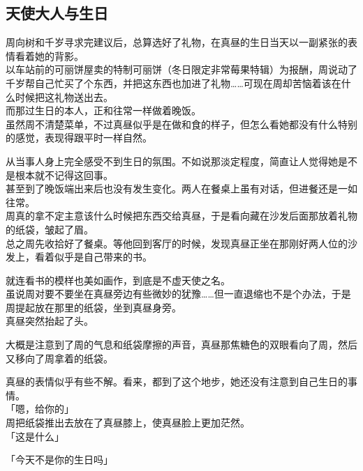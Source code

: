 \subsection{天使大人与生日}

周向树和千岁寻求完建议后，总算选好了礼物，在真昼的生日当天以一副紧张的表情看着她的背影。\\

以车站前的可丽饼屋卖的特制可丽饼（冬日限定非常莓果特辑）为报酬，周说动了千岁帮自己忙买了个东西，并把这东西也加进了礼物……可现在周却苦恼着该在什么时候把这礼物送出去。\\

而那过生日的本人，正和往常一样做着晚饭。\\

虽然周不清楚菜单，不过真昼似乎是在做和食的样子，但怎么看她都没有什么特别的感觉，表现得跟平时一样自然。

从当事人身上完全感受不到生日的氛围。不如说那淡定程度，简直让人觉得她是不是根本就不记得这回事。\\

甚至到了晚饭端出来后也没有发生变化。两人在餐桌上虽有对话，但进餐还是一如往常。\\

周真的拿不定主意该什么时候把东西交给真昼，于是看向藏在沙发后面那放着礼物的纸袋，皱起了眉。\\

总之周先收拾好了餐桌。等他回到客厅的时候，发现真昼正坐在那刚好两人位的沙发上，看着似乎是自己带来的书。

就连看书的模样也美如画作，到底是不虚天使之名。\\

虽说周对要不要坐在真昼旁边有些微妙的犹豫……但一直退缩也不是个办法，于是周提起放在那里的纸袋，坐到真昼身旁。\\

真昼突然抬起了头。

大概是注意到了周的气息和纸袋摩擦的声音，真昼那焦糖色的双眼看向了周，然后又移向了周拿着的纸袋。

真昼的表情似乎有些不解。看来，都到了这个地步，她还没有注意到自己生日的事情。\\

「嗯，给你的」\\

周把纸袋推出去放在了真昼膝上，使真昼脸上更加茫然。\\

「这是什么」

「今天不是你的生日吗」

